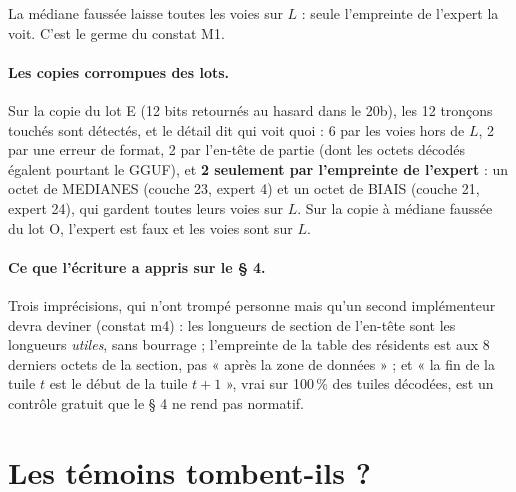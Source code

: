 La médiane faussée laisse toutes les voies sur $L$ : seule l'empreinte de l'expert la voit. C'est le germe du constat M1.

\paragraph{Les copies corrompues des lots.} Sur la copie du lot E (12 bits retournés au hasard dans le 20b), les 12 tronçons touchés sont détectés, et le détail dit qui voit quoi : 6 par les voies hors de $L$, 2 par une erreur de format, 2 par l'en-tête de partie (dont les octets décodés égalent pourtant le GGUF), et \textbf{2 seulement par l'empreinte de l'expert} : un octet de MEDIANES (couche 23, expert 4) et un octet de BIAIS (couche 21, expert 24), qui gardent toutes leurs voies sur $L$. Sur la copie à médiane faussée du lot O, l'expert est faux et les voies sont sur $L$.

\paragraph{Ce que l'écriture a appris sur le § 4.} Trois imprécisions, qui n'ont trompé personne mais qu'un second implémenteur devra deviner (constat m4) : les longueurs de section de l'en-tête sont les longueurs \emph{utiles}, sans bourrage ; l'empreinte de la table des résidents est aux 8 derniers octets de la section, pas « après la zone de données » ; et « la fin de la tuile $t$ est le début de la tuile $t+1$ », vrai sur \num{100}\,\% des tuiles décodées, est un contrôle gratuit que le § 4 ne rend pas normatif.

\section{Les témoins tombent-ils ?}\label{t2e-sec:temoins}

